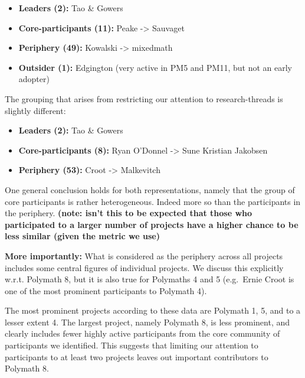 \documentclass[article, floatfix, groupaddress, prb]{revtex4-1}
\providecommand{\tightlist}{%
      \setlength{\itemsep}{0pt}\setlength{\parskip}{0pt}}
\begin{document}
\begin{itemize}
\tightlist
\item
  \textbf{Leaders (2):} Tao \& Gowers
\item
  \textbf{Core-participants (11):} Peake -\textgreater{} Sauvaget
\item
  \textbf{Periphery (49):} Kowalski -\textgreater{} mixedmath
\item
  \textbf{Outsider (1):} Edgington (very active in PM5 and PM11, but not
  an early adopter)
\end{itemize}


    \begin{figure}
        \begin{center}\end{center}
        \caption{}
        \label{}
    \end{figure}
    
    The grouping that arises from restricting our attention to
research-threads is slightly different:

\begin{itemize}
\tightlist
\item
  \textbf{Leaders (2):} Tao \& Gowers
\item
  \textbf{Core-participants (8):} Ryan O'Donnel -\textgreater{} Sune
  Kristian Jakobsen\\
\item
  \textbf{Periphery (53):} Croot -\textgreater{} Malkevitch
\end{itemize}

One general conclusion holds for both representations, namely that the
group of core participants is rather heterogeneous. Indeed more so than
the participants in the periphery. \textbf{(note: isn't this to be
expected that those who participated to a larger number of projects have
a higher chance to be less similar (given the metric we use)}

\textbf{More importantly:} What is considered as the periphery across
all projects includes some central figures of individual projects. We
discuss this explicitly w.r.t. Polymath 8, but it is also true for
Polymaths 4 and 5 (e.g.~Ernie Croot is one of the most prominent
participants to Polymath 4).

    The most prominent projects according to these data are Polymath 1, 5,
and to a lesser extent 4. The largest project, namely Polymath 8, is
less prominent, and clearly includes fewer highly active participants
from the core community of participants we identified. This suggests
that limiting our attention to participants to at least two projects
leaves out important contributors to Polymath 8.
\end{document}
